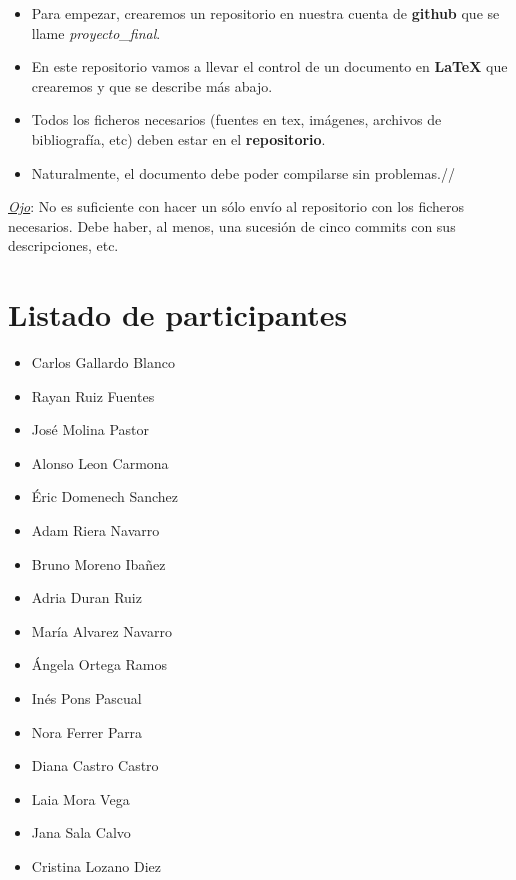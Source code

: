 \documentclass[a4paper,11pt]{article}
\begin{document}
\begin{itemize}
	\item Para empezar, crearemos un repositorio en nuestra cuenta de \textbf{github} que se llame \textit{proyecto\_final}.
	
	\item En este repositorio vamos a llevar el control de un documento en \textbf{LaTeX} que crearemos y que se describe más abajo.
	
	\item Todos los ficheros necesarios (fuentes en tex, imágenes, archivos de bibliografía, etc) deben estar en el \textbf{repositorio}.
	                                                                             
	\item Naturalmente, el documento debe poder compilarse sin problemas.//          
\end{itemize}

\textit{\underline{Ojo}}: No es suficiente con hacer un sólo envío al repositorio con los ficheros necesarios. Debe haber, al menos, una sucesión de cinco commits con sus descripciones, etc.

\newpage

\section{Listado de participantes}

\begin{minipage}{0.5\linewidth}
	\begin{itemize}
		\item Carlos Gallardo Blanco
		\item Rayan Ruiz Fuentes
		\item José Molina Pastor
		\item Alonso Leon Carmona
		\item Éric Domenech Sanchez
		\item Adam Riera Navarro
		\item Bruno Moreno Ibañez
		\item Adria Duran Ruiz
	\end{itemize}
\end{minipage}
\begin{minipage}{0.5\linewidth}
	\begin{itemize}
		\item María Alvarez Navarro
		\item Ángela Ortega Ramos
		\item Inés Pons Pascual
		\item Nora Ferrer Parra
		\item Diana Castro Castro
		\item Laia Mora Vega
		\item Jana Sala Calvo
		\item Cristina Lozano Diez
	\end{itemize}
\end{minipage}
\end{document}
